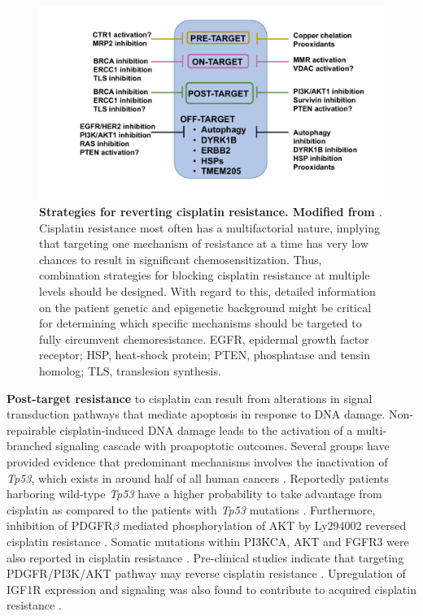 \begin{figure}
\centering
\includegraphics[width=\textwidth]{Figures/chap1/circumventingcisplatinresistance.pdf}
	\caption[Mechanism of action of cisplatin]
	{\small
	    \textbf{Strategies for reverting cisplatin resistance. Modified from  \cite{galluzzi2012molecular}}.
	     Cisplatin resistance most often has a multifactorial nature, implying that targeting one mechanism of resistance at a time has very low chances to result in significant chemosensitization. Thus, combination strategies for blocking cisplatin resistance at multiple levels should be designed. With regard to this, detailed information on the patient genetic and epigenetic background might be critical for determining which specific mechanisms should be targeted to fully circumvent chemoresistance. EGFR, epidermal growth factor receptor; HSP, heat-shock protein; PTEN, phosphatase and tensin homolog; TLS, translesion synthesis.
	}
	\label{fig:circumventingcisplatinresistance}
\end{figure}


\textbf{Post-target resistance} to cisplatin can result from alterations in signal transduction pathways that mediate apoptosis in response to DNA damage. Non-repairable cisplatin-induced DNA damage leads to the activation of a multi-branched signaling cascade with proapoptotic outcomes. Several groups have provided evidence that predominant mechanisms involves the inactivation of \textit{Tp53}, which exists in around half of all human cancers \cite{kirsch1998tumor}. Reportedly patients harboring wild-type \textit{Tp53} have a higher probability to take advantage from cisplatin as compared to the patients with \textit{Tp53} mutations \cite{vousden2007p53,gadducci2002molecular}. 
Furthermore, inhibition of PDGFR$\beta$ mediated phosphorylation of AKT by Ly294002 reversed cisplatin resistance \cite{juliachs2014pdgfrbeta}. Somatic mutations within PI3KCA, AKT and FGFR3 were also reported in cisplatin resistance \cite{feldman2014presence}. Pre-clinical studies indicate that targeting PDGFR/PI3K/AKT pathway may reverse cisplatin resistance \cite{juliachs2013effectivity}.
Upregulation of IGF1R expression and signaling was also found to contribute to acquired cisplatin resistance \cite{selfe2018igf1r}. 

